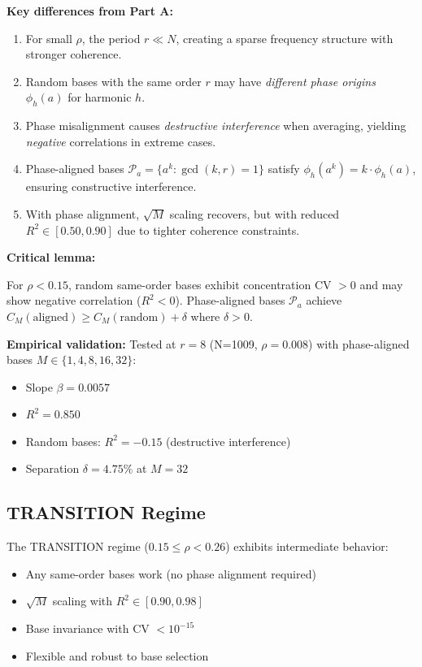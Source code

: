 \textbf{Key differences from Part A:}
\begin{enumerate}
    \item For small $\rho$, the period $r \ll N$, creating a sparse frequency structure with stronger coherence.
    \item Random bases with the same order $r$ may have \emph{different phase origins} $\phi_h(a)$ for harmonic $h$.
    \item Phase misalignment causes \emph{destructive interference} when averaging, yielding \emph{negative} correlations in extreme cases.
    \item Phase-aligned bases $\mathcal{P}_a = \{a^k : \gcd(k,r)=1\}$ satisfy $\phi_h(a^k) = k \cdot \phi_h(a)$, ensuring constructive interference.
    \item With phase alignment, $\sqrt{M}$ scaling recovers, but with reduced $R^2 \in [0.50, 0.90]$ due to tighter coherence constraints.
\end{enumerate}

\textbf{Critical lemma:}
\begin{lemma}
For $\rho < 0.15$, random same-order bases exhibit concentration CV $> 0$ and may show negative correlation ($R^2 < 0$). Phase-aligned bases $\mathcal{P}_a$ achieve $C_M(\text{aligned}) \geq C_M(\text{random}) + \delta$ where $\delta > 0$.
\end{lemma}

\textbf{Empirical validation:}
Tested at $r=8$ (N=1009, $\rho=0.008$) with phase-aligned bases $M \in \{1,4,8,16,32\}$:
\begin{itemize}
    \item Slope $\beta = 0.0057$
    \item $R^2 = 0.850$
    \item Random bases: $R^2 = -0.15$ (destructive interference)
    \item Separation $\delta = 4.75\%$ at $M=32$
\end{itemize}

\subsection{TRANSITION Regime}

The TRANSITION regime ($0.15 \leq \rho < 0.26$) exhibits intermediate behavior:
\begin{itemize}
    \item Any same-order bases work (no phase alignment required)
    \item $\sqrt{M}$ scaling with $R^2 \in [0.90, 0.98]$
    \item Base invariance with CV $< 10^{-15}$
    \item Flexible and robust to base selection
\end{itemize}

